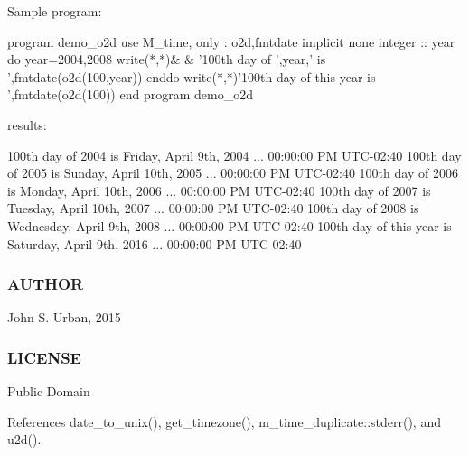 \begin{DoxyVerb}Sample program:

 program demo_o2d
 use M_time, only : o2d,fmtdate
 implicit none
 integer :: year
    do year=2004,2008
       write(*,*)&
       & '100th day of ',year,' is ',fmtdate(o2d(100,year))
    enddo
    write(*,*)'100th day of this year is ',fmtdate(o2d(100))
 end program demo_o2d

results:

 100th day of 2004 is Friday, April 9th, 2004 ...
 00:00:00 PM UTC-02:40
 100th day of 2005 is Sunday, April 10th, 2005 ...
 00:00:00 PM UTC-02:40
 100th day of 2006 is Monday, April 10th, 2006 ...
 00:00:00 PM UTC-02:40
 100th day of 2007 is Tuesday, April 10th, 2007 ...
 00:00:00 PM UTC-02:40
 100th day of 2008 is Wednesday, April 9th, 2008 ...
 00:00:00 PM UTC-02:40
 100th day of this year is Saturday, April 9th, 2016 ...
 00:00:00 PM UTC-02:40
\end{DoxyVerb}
 \subsubsection*{A\+U\+T\+H\+OR}

John S. Urban, 2015 \subsubsection*{L\+I\+C\+E\+N\+SE}

Public Domain 

References date\+\_\+to\+\_\+unix(), get\+\_\+timezone(), m\+\_\+time\+\_\+duplicate\+::stderr(), and u2d().

